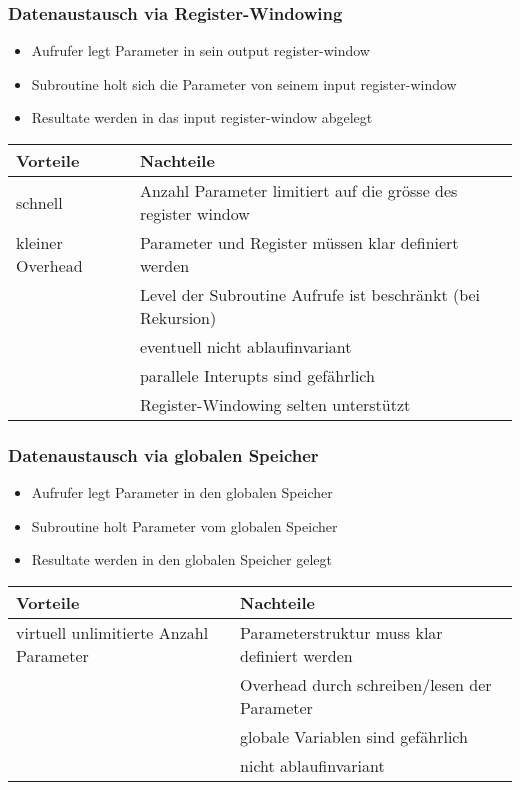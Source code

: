 \subsubsection{Datenaustausch via Register-Windowing}
\begin{itemize}
  \item Aufrufer legt Parameter in sein output register-window
  \item Subroutine holt sich die Parameter von seinem input register-window
  \item Resultate werden in das input register-window abgelegt
\end{itemize}
\begin{tabular}{l|l}
	\textbf{Vorteile} 	& \textbf{Nachteile} \\
	\hline
	schnell				& Anzahl Parameter limitiert auf die grösse des register window \\
	kleiner Overhead	& Parameter und Register müssen klar definiert werden \\
						& Level der Subroutine Aufrufe ist beschränkt (bei Rekursion) \\
						& eventuell nicht ablaufinvariant \\ 
						& parallele Interupts sind gefährlich \\
						& Register-Windowing selten unterstützt
\end{tabular}


\subsubsection{Datenaustausch via globalen Speicher}
\begin{itemize}
  \item Aufrufer legt Parameter in den globalen Speicher
  \item Subroutine holt Parameter vom globalen Speicher
  \item Resultate werden in den globalen Speicher gelegt
\end{itemize}
\begin{tabular}{l|l}
	\textbf{Vorteile} 	& \textbf{Nachteile} \\
	\hline
	virtuell unlimitierte Anzahl Parameter	& Parameterstruktur muss klar definiert werden \\
											& Overhead durch schreiben/lesen der Parameter \\
											& globale Variablen sind gefährlich \\
											& nicht ablaufinvariant
\end{tabular}


